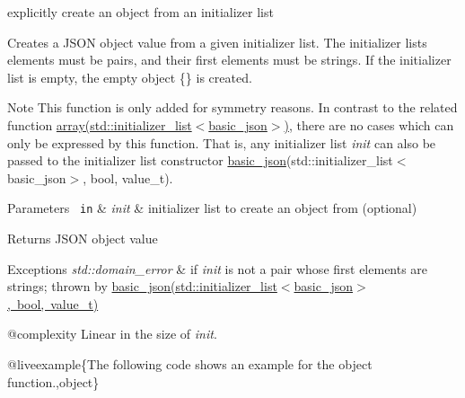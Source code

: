 explicitly create an object from an initializer list 

Creates a J\+S\+ON object value from a given initializer list. The initializer lists elements must be pairs, and their first elements must be strings. If the initializer list is empty, the empty object {\ttfamily \{\}} is created.

\begin{DoxyNote}{Note}
This function is only added for symmetry reasons. In contrast to the related function \mbox{\hyperlink{classnlohmann_1_1basic__json_a4a4ec75e4d2845d9bcf7a9e5458e4949}{array(std\+::initializer\+\_\+list$<$basic\+\_\+json$>$)}}, there are no cases which can only be expressed by this function. That is, any initializer list {\itshape init} can also be passed to the initializer list constructor \mbox{\hyperlink{classnlohmann_1_1basic__json}{basic\+\_\+json}}(std\+::initializer\+\_\+list$<$basic\+\_\+json$>$, bool, value\+\_\+t).
\end{DoxyNote}

\begin{DoxyParams}[1]{Parameters}
\mbox{\texttt{ in}}  & {\em init} & initializer list to create an object from (optional)\\
\hline
\end{DoxyParams}
\begin{DoxyReturn}{Returns}
J\+S\+ON object value
\end{DoxyReturn}

\begin{DoxyExceptions}{Exceptions}
{\em std\+::domain\+\_\+error} & if {\itshape init} is not a pair whose first elements are strings; thrown by \mbox{\hyperlink{classnlohmann_1_1basic__json_afbad48316e7cd37366ba3ac5d7e5859e}{basic\+\_\+json(std\+::initializer\+\_\+list$<$basic\+\_\+json$>$, bool, value\+\_\+t)}}\\
\hline
\end{DoxyExceptions}
@complexity Linear in the size of {\itshape init}.

@liveexample\{The following code shows an example for the {\ttfamily object} function.,object\}

